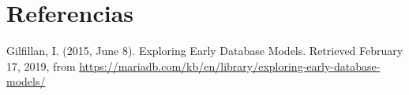 \documentclass{article}
\begin{document}
    \section{Referencias}
    \begin{thebibliography}{}
            Gilfillan, I. (2015, June 8). Exploring Early Database Models. 
            Retrieved February 17, 2019, from 
            \href{https://mariadb.com/kb/en/library/exploring-early-database-models/}
            {https://mariadb.com/kb/en/library/exploring-early-database-models/}
    \end{thebibliography}
\end{document}
